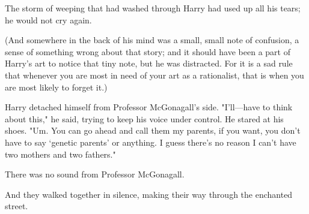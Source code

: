The storm of weeping that had washed through Harry had used up all his tears;
he would not cry again.

(And somewhere in the back of his mind was a small, small note of confusion, a
sense of something wrong about that story; and it should have been a part of
Harry's art to notice that tiny note, but he was distracted. For it is a sad
rule that whenever you are most in need of your art as a rationalist, that is
when you are most likely to forget it.)

Harry detached himself from Professor McGonagall's side. "I'll—have to think
about this," he said, trying to keep his voice under control. He stared at his
shoes. "Um. You can go ahead and call them my parents, if you want, you don't
have to say `genetic parents' or anything. I guess there's no reason I can't
have two mothers and two fathers."

There was no sound from Professor McGonagall.

And they walked together in silence, making their way through the enchanted street.
